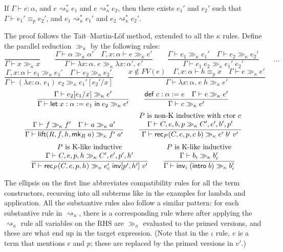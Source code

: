 \begin{theorem}\label{thm:church_rosser}
If $\Gamma\vdash e:\alpha$, and $e\rightsquigarrow_\kappa^* e_1$ and $e\rightsquigarrow_\kappa^* e_2$, then there exists $e_1'$ and $e_2'$ such that $\Gamma\vdash e_1'\equiv_p e_2'$, and $e_1\rightsquigarrow_\kappa^* e_1'$ and $e_2\rightsquigarrow_\kappa^* e_2'$.
\end{theorem}
The proof follows the Tait--Martin-L\"{o}f method, extended to all the $\kappa$ rules. Define the parallel reduction $\gg_\kappa$ by the following rules:
$$\frac{}{\Gamma\vdash x\gg_\kappa x}\qquad
\frac{\Gamma\vdash \alpha\gg_\kappa\alpha'\quad \Gamma,x:\alpha\vdash e\gg_\kappa e'}{\Gamma\vdash \lambda x:\alpha.\;e\gg_\kappa \lambda x:\alpha'.\;e'}\qquad
\frac{\Gamma\vdash e_1\gg_\kappa e_1'\quad \Gamma\vdash e_2\gg_\kappa e_2'}{\Gamma\vdash e_1\;e_2\gg_\kappa e_1'\;e_2'}\qquad\dots$$
$$\frac{\Gamma,x:\alpha\vdash e_1\gg_\kappa e_1'\quad \Gamma\vdash e_2\gg_\kappa e_2'}{\Gamma\vdash (\lambda x:\alpha.\;e_1)\;e_2\gg_\kappa e_1'[e_2'/x]}\qquad
\frac{x\notin FV(e)\quad \Gamma,x:\alpha\vdash h\equiv_p x\quad \Gamma\vdash e\gg_\kappa e'}{\Gamma\vdash \lambda x:\alpha.\;e\;h\gg_\kappa e'}$$
$$\frac{\Gamma\vdash e_2[e_1/x]\gg_\kappa e'}{\Gamma\vdash \elet{x:\alpha:=e_1}{e_2}\gg_\kappa e'}\qquad
\frac{\mathsf{def}\;c:\alpha:=e\quad \Gamma\vdash e\gg_\kappa e'}{\Gamma\vdash c\gg_\kappa e'}$$
$$\frac{\Gamma\vdash f\gg_\kappa f'\quad \Gamma\vdash a\gg_\kappa a'}{\Gamma\vdash \lift(R,f,h,\mk_R\;a)\gg_\kappa f'\;a'}\qquad
\frac{\begin{matrix}
P\mbox{ is non-K inductive with ctor }c\\
\Gamma\vdash C,e,b,p\gg_\kappa C',e',b',p'
\end{matrix}}{\Gamma\vdash \rec_P(C,e,p,c\;b)\gg_\kappa e'\;b'\;v'}$$
$$\frac{\begin{matrix}
P\mbox{ is K-like inductive}\\
\Gamma\vdash C,e,p,h\gg_\kappa C',e',p',h'
\end{matrix}}{\Gamma\vdash \rec_P(C,e,p,h)\gg_\kappa e_c'\;\inv[p',h']\;v'}\qquad
\frac{\begin{matrix}
P\mbox{ is K-like inductive}\\
\Gamma\vdash b_i\gg_\kappa b_i'
\end{matrix}}{\Gamma\vdash \inv_i\;(\intro\;b)\gg_\kappa b_i'}$$

The ellipsis on the first line abbreviates compatibility rules for all the term constructors, recursing into all subterms like in the examples for lambda and application. All the substantive rules also follow a similar pattern: for each substantive rule in $\rightsquigarrow_\kappa$, there is a corresponding rule where after applying the $\rightsquigarrow_\kappa$ rule all variables on the RHS are $\gg_\kappa$ evaluated to the primed versions, and these are what end up in the target expression. (Note that in the $\iota$ rule, $v$ is a term that mentions $e$ and $p$; these are replaced by the primed versions in $v'$.)


